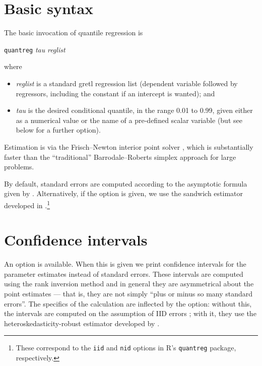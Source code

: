 \section{Basic syntax}

The basic invocation of quantile regression is

\vspace{1em}
\noindent
\qquad \texttt{quantreg} \textsl{tau} \textsl{reglist}
\vspace{1em}

where

\begin{itemize}
\item \textsl{reglist} is a standard \textsf{gretl} regression list
  (dependent variable followed by regressors, including the constant
  if an intercept is wanted); and
\item \textsl{tau} is the desired conditional quantile, in the range
  0.01 to 0.99, given either as a numerical value or the name of a
  pre-defined scalar variable (but see below for a further option).
\end{itemize}

Estimation is via the Frisch--Newton interior point solver
\citep{portnoy97}, which is substantially faster than the
``traditional'' Barrodale--Roberts \citeyearpar{barrodale74} simplex
approach for large problems.

By default, standard errors are computed according to the asymptotic
formula given by \cite{koenker-bassett78}.  Alternatively, if the
 option is given, we use the sandwich estimator
developed in \cite{koenker-zhao94}.\footnote{These correspond to the
  \texttt{iid} and \texttt{nid} options in \textsf{R}'s
  \texttt{quantreg} package, respectively.}

\section{Confidence intervals}

An option  is available.  When this is given we
print confidence intervals for the parameter estimates instead of
standard errors.  These intervals are computed using the rank
inversion method and in general they are asymmetrical about the point
estimates --- that is, they are not simply ``plus or minus so many
standard errors''.  The specifics of the calculation are inflected by
the  option: without this, the intervals are computed
on the assumption of IID errors \citep{koenker94}; with it, they use
the heteroskedasticity-robust estimator developed by
\cite{koenker-machado99}.

